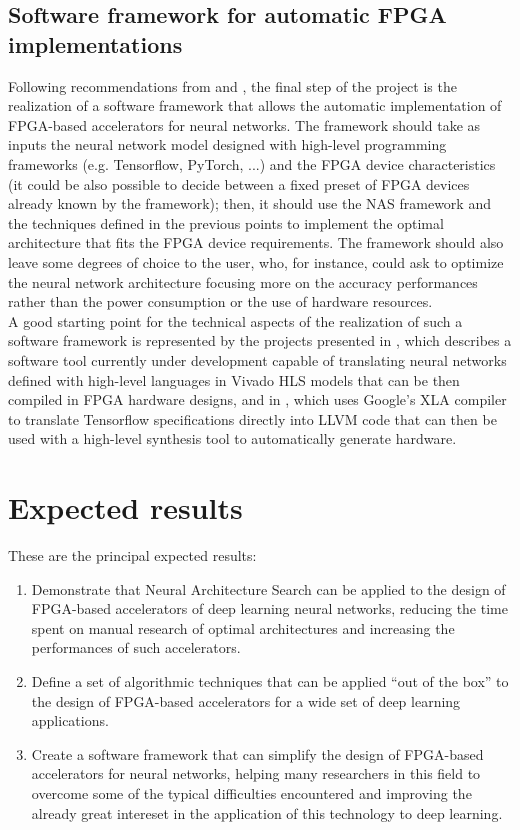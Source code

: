 \documentclass[11pt,a4paper]{article}
\begin{document}
\subsection{Software framework for automatic FPGA implementations}
Following recommendations from \cite{wang_survey_2018} and \cite{shawahna_review_2019}, the final step of the project is the realization of a software framework that allows the automatic implementation of FPGA-based accelerators for neural networks. The framework should take as inputs the neural network model designed with high-level programming frameworks (e.g. Tensorflow, PyTorch, ...) and the FPGA device characteristics (it could be also possible to decide between a fixed preset of FPGA devices already known by the framework); then, it should use the NAS framework and the techniques defined in the previous points to implement the optimal architecture that fits the FPGA device requirements. The framework should also leave some degrees of choice to the user, who, for instance, could ask to optimize the neural network architecture focusing more on the accuracy performances rather than the power consumption or the use of hardware resources.
\\A good starting point for the technical aspects of the realization of such a software framework is represented by the projects presented in \cite{duarte_hls4ml_2018}, which describes a software tool currently under development capable of translating neural networks defined with high-level languages in Vivado HLS models that can be then compiled in FPGA hardware designs, and in \cite{noronha_leflow_2018}, which uses Google’s XLA compiler to translate Tensorflow specifications directly into LLVM code that can then be used with a high-level synthesis tool to automatically generate hardware.

\section{Expected results}
These are the principal expected results:
\begin{enumerate}
    \item Demonstrate that Neural Architecture Search can be applied to the design of FPGA-based accelerators of deep learning neural networks, reducing the time spent on manual research of optimal architectures and increasing the performances of such accelerators.
    \item Define a set of algorithmic techniques that can be applied ``out of the box'' to the design of FPGA-based accelerators for a wide set of deep learning applications.
    \item Create a software framework that can simplify the design of FPGA-based accelerators for neural networks, helping many researchers in this field to overcome some of the typical difficulties encountered and improving the already great intereset in the application of this technology to deep learning.
\end{enumerate}


\end{document}
